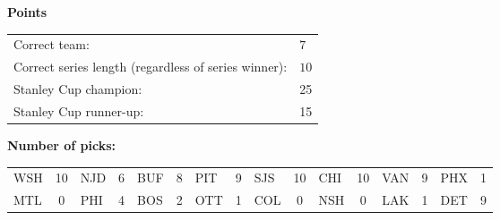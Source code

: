 \documentclass[10pt]{article}
\begin{document}
{\bf Points}\\
\begin{minipage}{12cm}
    \begin{tabular}{l l}
        Correct team:	& $7$\\
        Correct series length (regardless of series winner):	& $10$\\
        Stanley Cup champion:	& 25\\
        Stanley Cup runner-up:	& 15\\
    \end{tabular}

    \vspace{1cm}
    {\bf Number of picks:}\\
    \begin{tabular}{lc | lc | lc | lc | lc | lc | lc | lc }
        WSH & 10 & NJD & 6 & BUF & 8 & PIT & 9 & SJS & 10 & CHI & 10 & VAN & 9 & PHX & 1 \\
        MTL & 0 & PHI & 4 & BOS & 2 & OTT & 1 & COL & 0 & NSH & 0 & LAK & 1 & DET & 9 \\
    \end{tabular}
\end{minipage}
\end{document}
